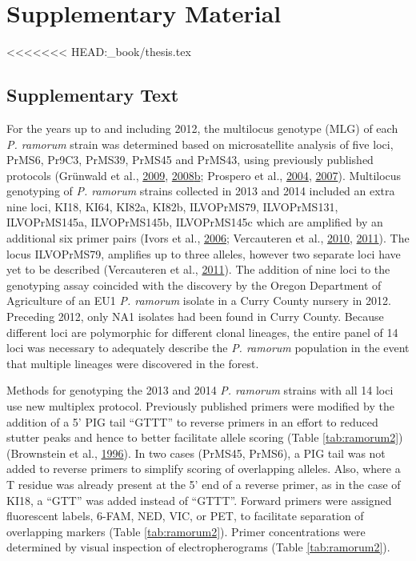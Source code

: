 \documentclass[double,12pt]{beavtex}
\begin{document}
  \section{Supplementary Material}\label{supplementary-material}
<<<<<<< HEAD:_book/thesis.tex
  
  \subsection{Supplementary Text}\label{text:S1}
  
  For the years up to and including 2012, the multilocus genotype (MLG) of
  each \emph{P. ramorum} strain was determined based on microsatellite
  analysis of five loci, PrMS6, Pr9C3, PrMS39, PrMS45 and PrMS43, using
  previously published protocols (Grünwald et al.,
  \protect\hyperlink{ref-grunwald2009standardizing}{2009},
  \protect\hyperlink{ref-grunwald2008susceptibility}{2008}\protect\hyperlink{ref-grunwald2008susceptibility}{b};
  Prospero et al., \protect\hyperlink{ref-prospero2004isolation}{2004},
  \protect\hyperlink{ref-prospero2007population}{2007}). Multilocus
  genotyping of \emph{P. ramorum} strains collected in 2013 and 2014
  included an extra nine loci, KI18, KI64, KI82a, KI82b, ILVOPrMS79,
  ILVOPrMS131, ILVOPrMS145a, ILVOPrMS145b, ILVOPrMS145c which are
  amplified by an additional six primer pairs (Ivors et al.,
  \protect\hyperlink{ref-ivors2006microsatellite}{2006}; Vercauteren et
  al., \protect\hyperlink{ref-vercauteren2010clonal}{2010},
  \protect\hyperlink{ref-vercauteren2011identification}{2011}). The locus
  ILVOPrMS79, amplifies up to three alleles, however two separate loci
  have yet to be described (Vercauteren et al.,
  \protect\hyperlink{ref-vercauteren2011identification}{2011}). The
  addition of nine loci to the genotyping assay coincided with the
  discovery by the Oregon Department of Agriculture of an EU1 \emph{P.
  ramorum} isolate in a Curry County nursery in 2012. Preceding 2012, only
  NA1 isolates had been found in Curry County. Because different loci are
  polymorphic for different clonal lineages, the entire panel of 14 loci
  was necessary to adequately describe the \emph{P. ramorum} population in
  the event that multiple lineages were discovered in the forest.
  
  Methods for genotyping the 2013 and 2014 \emph{P. ramorum} strains with
  all 14 loci use new multiplex protocol. Previously published primers
  were modified by the addition of a 5' PIG tail ``GTTT'' to reverse
  primers in an effort to reduced stutter peaks and hence to better
  facilitate allele scoring (Table \ref{tab:ramorum2}) (Brownstein et al.,
  \protect\hyperlink{ref-brownstein1996modulation}{1996}). In two cases
  (PrMS45, PrMS6), a PIG tail was not added to reverse primers to simplify
  scoring of overlapping alleles. Also, where a T residue was already
  present at the 5' end of a reverse primer, as in the case of KI18, a
  ``GTT'' was added instead of ``GTTT''. Forward primers were assigned
  fluorescent labels, 6-FAM, NED, VIC, or PET, to facilitate separation of
  overlapping markers (Table \ref{tab:ramorum2}). Primer concentrations
  were determined by visual inspection of electropherograms (Table
  \ref{tab:ramorum2}).
  
\end{document}
